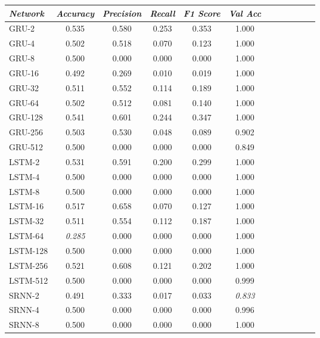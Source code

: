 \begin{table}[t]
\begin{tabularx}{\textwidth}{@{}l*{10}{C}c@{}}
\toprule
  \textit{Network} &  \textit{Accuracy} &  \textit{Precision} &  \textit{Recall} &  \textit{F1 Score} &  \textit{Val Acc} \\
\midrule
    GRU-2 &     0.535 &      0.580 &   0.253 &     0.353 &    1.000 \\
    GRU-4 &     0.502 &      0.518 &   0.070 &     0.123 &    1.000 \\
    GRU-8 &     0.500 &      0.000 &   0.000 &     0.000 &    1.000 \\
   GRU-16 &     0.492 &      0.269 &   0.010 &     0.019 &    1.000 \\
   GRU-32 &     0.511 &      0.552 &   0.114 &     0.189 &    1.000 \\
   GRU-64 &     0.502 &      0.512 &   0.081 &     0.140 &    1.000 \\
  GRU-128 &     0.541 &      0.601 &   0.244 &     0.347 &    1.000 \\
  GRU-256 &     0.503 &      0.530 &   0.048 &     0.089 &    0.902 \\
  GRU-512 &     0.500 &      0.000 &   0.000 &     0.000 &    0.849 \\
   LSTM-2 &     0.531 &      0.591 &   0.200 &     0.299 &    1.000 \\
   LSTM-4 &     0.500 &      0.000 &   0.000 &     0.000 &    1.000 \\
   LSTM-8 &     0.500 &      0.000 &   0.000 &     0.000 &    1.000 \\
  LSTM-16 &     0.517 &      0.658 &   0.070 &     0.127 &    1.000 \\
  LSTM-32 &     0.511 &      0.554 &   0.112 &     0.187 &    1.000 \\
  LSTM-64 &     \textit{0.285} &      0.000 &   0.000 &     0.000 &    1.000 \\
 LSTM-128 &     0.500 &      0.000 &   0.000 &     0.000 &    1.000 \\
 LSTM-256 &     0.521 &      0.608 &   0.121 &     0.202 &    1.000 \\
 LSTM-512 &     0.500 &      0.000 &   0.000 &     0.000 &    0.999 \\
   SRNN-2 &     0.491 &      0.333 &   0.017 &     0.033 &    \textit{0.833} \\
   SRNN-4 &     0.500 &      0.000 &   0.000 &     0.000 &    0.996 \\
   SRNN-8 &     0.500 &      0.000 &   0.000 &     0.000 &    1.000 \\

\end{tabularx}
\end{table}
